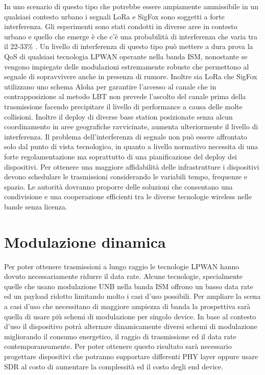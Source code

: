 \documentclass[12pt,a4paper,openright,twoside]{report}
\begin{document}
In uno scenario di questo tipo che potrebbe essere ampiamente ammissibile in un qualsiasi contesto urbano i segnali LoRa e SigFox sono soggetti a forte interferenza.
Gli esperimenti sono stati condotti in diverse aree in contesto urbano e quello che emerge \`e che c'\`e una probabilit\`a di interferenza che varia tra il 22-33\% \cite{K15}.
Un livello di interferenza di questo tipo pu\`o mettere a dura prova la QoS di qualsiasi tecnologia LPWAN operante nella banda ISM, nonostante se vengono impiegate delle modulazioni estremamente robuste che permettono al segnale di sopravvivere anche in presenza di rumore. 
Inoltre sia LoRa che SigFox utilizzano uno schema Aloha per garantire l'accesso al canale che in contrapposizione al metodo LBT non prevede l'ascolto del canale prima della trasmissione facendo precipitare il livello di performance a causa delle molte collisioni. 
Inoltre il deploy di diverse base station posizionate senza alcun coordinamento in aree geografiche ravvicinate, aumenta ulteriormente il livello di interferenza.
Il problema dell'interferenza di segnale non pu\`o essere affrontato solo dal punto di vista tecnologico, in quanto a livello normativo necessita di una forte regolamentazione ma soprattutto di una pianificazione del deploy dei dispositivi. Per ottenere una maggiore affidabilit\`a delle infrastrutture i dispositivi devono schedulare le trasmissioni considerando le variabili tempo, frequenze e spazio. 
Le autorit\`a dovranno proporre delle soluzioni che consentano una condivisione e una cooperazione efficienti tra le diverse tecnologie wireless nelle bande senza licenza. 

\section{Modulazione dinamica}
Per poter ottenere trasmissioni a lungo raggio le tecnologie LPWAN hanno dovuto necessariamente ridurre il data rate. Alcune tecnologie, specialmente quelle che usano modulazione UNB nella banda ISM offrono un basso data rate ed un payload ridotto limitando molto i casi d'uso possibili. 
Per ampliare la scena a casi d'uso che necessitano di maggiore ampiezza di banda la prospettiva sar\`a quella di usare pi\`u schemi di modulazione per singolo device. 
In base al contesto d'uso il dispositivo potr\`a alternare dinamicamente diversi schemi di modulazione migliorando il consumo energetico, il raggio di trasmissione ed il data rate contemporaneamente. 
Per poter ottenere questo risultato sar\`a necessario progettare dispositivi che potranno supportare differenti PHY layer oppure usare SDR al costo di aumentare la complessit\`a ed il costo degli end device. 
\end{document}
